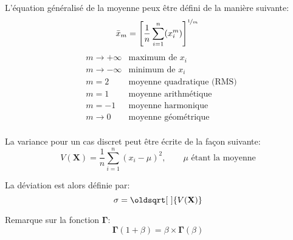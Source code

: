 \documentclass[12pt, oneside]{report}
\renewcommand*{\sqrt}[2][\ ]{\oldsqrt[#1]{#2}}
\begin{document}
L’équation généralisé de la moyenne peux être défini de la manière suivante:
\begin{equation}\label{eq:moyenne_generale}
    \bar{x}_{m} = \left[ \frac{1}{n} \sum_{i=1}^{n}(x_{i}^{m})\right]^{\nicefrac{1}{m}}\\
\end{equation}
\begin{align*}\label{eq:parametre_m}
    & m \to +\infty & \text{maximum de } x_{i}\\
    & m \to -\infty & \text{minimum de } x_{i}\\
    & m = 2         & \text{moyenne quadratique (RMS)}\\
    & m = 1         & \text{moyenne arithmétique}\\
    & m = -1        & \text{moyenne harmonique}\\
    & m \to 0       & \text{moyenne géométrique}\\
\end{align*}

La variance pour un cas discret peut être écrite de la façon suivante:
\begin{equation}
    V(\mathbf{X}) = \frac{1}{n} \sum_{i=1}^{n} (x_{i} - \mu)^{2}, \qquad \mu \text{ étant la moyenne}
\end{equation}

La déviation est alors définie par:
\begin{equation}
    \sigma = \sqrt{V(\mathbf{X})}
\end{equation}


Remarque sur la fonction $\mathbf{\Gamma}$:
\begin{equation}
    \mathbf{\Gamma}(1+\beta) = \beta \times \mathbf{\Gamma}(\beta)
\end{equation}


\printbibliography
\end{document}
